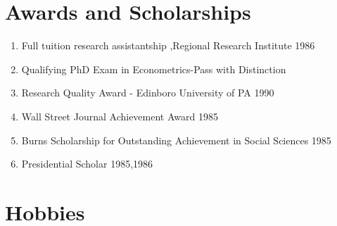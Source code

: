 \documentclass{ResumeDesignFormat1}
\begin{document}
\section{Awards and Scholarships}
\begin{enumerate} \itemsep -2pt
\item Full tuition research assistantship ,Regional Research Institute 1986  \\
\item Qualifying PhD Exam in Econometrics-Pass with Distinction\\
\item Research Quality Award - Edinboro University of PA 1990\\
\item Wall Street Journal Achievement Award 1985\\
\item Burns Scholarship for Outstanding Achievement in Social Sciences 1985\\
\item Presidential Scholar 1985,1986\\
\end{enumerate}
\section{Hobbies}

\begin{enumerate}
\end{enumerate}
\end{document}
